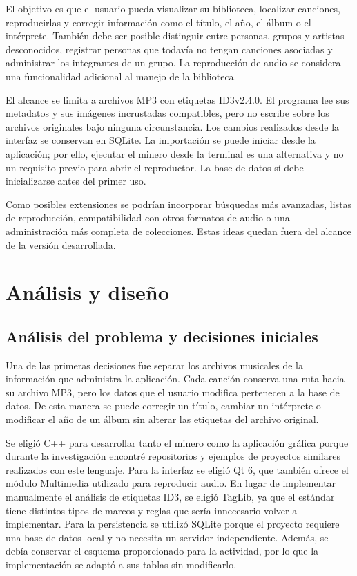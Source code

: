 \documentclass[10pt,a4paper]{article}
\begin{document}
El objetivo es que el usuario pueda visualizar su biblioteca, localizar canciones, reproducirlas y corregir información como el título, el año, el álbum o el intérprete. También debe ser posible distinguir entre personas, grupos y artistas desconocidos, registrar personas que todavía no tengan canciones asociadas y administrar los integrantes de un grupo. La reproducción de audio se considera una funcionalidad adicional al manejo de la biblioteca.

El alcance se limita a archivos MP3 con etiquetas ID3v2.4.0. El programa lee sus metadatos y sus imágenes incrustadas compatibles, pero no escribe sobre los archivos originales bajo ninguna circunstancia. Los cambios realizados desde la interfaz se conservan en SQLite. La importación se puede iniciar desde la aplicación; por ello, ejecutar el minero desde la terminal es una alternativa y no un requisito previo para abrir el reproductor. La base de datos sí debe inicializarse antes del primer uso.

Como posibles extensiones se podrían incorporar búsquedas más avanzadas, listas de reproducción, compatibilidad con otros formatos de audio o una administración más completa de colecciones. Estas ideas quedan fuera del alcance de la versión desarrollada.

\section{Análisis y diseño}

\subsection{Análisis del problema y decisiones iniciales}
Una de las primeras decisiones fue separar los archivos musicales de la información que administra la aplicación. Cada canción conserva una ruta hacia su archivo MP3, pero los datos que el usuario modifica pertenecen a la base de datos. De esta manera se puede corregir un título, cambiar un intérprete o modificar el año de un álbum sin alterar las etiquetas del archivo original.

Se eligió C++ para desarrollar tanto el minero como la aplicación gráfica porque durante la investigación encontré repositorios y ejemplos de proyectos similares realizados con este lenguaje. Para la interfaz se eligió Qt 6, que también ofrece el módulo Multimedia utilizado para reproducir audio. En lugar de implementar manualmente el análisis de etiquetas ID3, se eligió TagLib, ya que el estándar tiene distintos tipos de marcos y reglas que sería innecesario volver a implementar. Para la persistencia se utilizó SQLite porque el proyecto requiere una base de datos local y no necesita un servidor independiente. Además, se debía conservar el esquema proporcionado para la actividad, por lo que la implementación se adaptó a sus tablas sin modificarlo.
\end{document}
